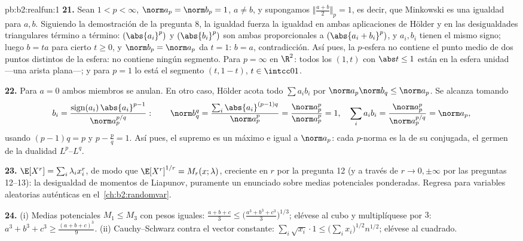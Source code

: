 \begin{solution}{pb:b2:realfun:1}
\textbf{21.} Sean $1 < p < \infty$, $\norm a_p = \norm b_p = 1$, $a
\neq b$, y supongamos $\bigl\Vert\frac{a+b}2\bigr\Vert_p = 1$, es
decir, que Minkowski es una igualdad para $a, b$. Siguiendo la
demostración de la pregunta 8, la igualdad fuerza la igualdad en
ambas aplicaciones de Hölder y en las desigualdades triangulares
término a término: $(\abs{a_i}^p)$ y $(\abs{b_i}^p)$ son ambas
proporcionales a $(\abs{a_i + b_i}^p)$, y $a_i, b_i$ tienen el
mismo signo; luego $b = ta$ para cierto $t \geq 0$, y $\norm b_p =
\norm a_p$ da $t = 1$: $b = a$, contradicción. Así pues, la
$p$-esfera no contiene el punto medio de dos puntos distintos de la
esfera: no contiene ningún segmento. Para $p = \infty$ en $\R^2$:
todos los $(1, t)$ con $\abs t \leq 1$ están en la esfera unidad
---una arista plana---; y para $p = 1$ lo está el segmento $(t, 1 -
t)$, $t \in \intcc01$.

\textbf{22.} Para $a = 0$ ambos miembros se anulan. En otro caso,
Hölder acota todo $\sum a_ib_i$ por $\norm a_p\norm b_q \leq \norm
a_p$. Se alcanza tomando
\[
b_i = \frac{\operatorname{sign}(a_i)\,\abs{a_i}^{p-1}}
{\norm a_p^{p/q}} :
\qquad
\norm b_q^q = \frac{\sum_i\abs{a_i}^{(p-1)q}}{\norm a_p^{p}}
= \frac{\norm a_p^p}{\norm a_p^p} = 1,
\quad
\sum_ia_ib_i = \frac{\norm a_p^p}{\norm a_p^{p/q}} =
\norm a_p ,
\]
usando $(p-1)q = p$ y $p - \frac pq = 1$. Así pues, el supremo es un
máximo e igual a $\norm a_p$: cada $p$-norma es la   de su
conjugada, el germen de la dualidad $L^p$--$L^q$.

\textbf{23.} $\E[X^r] = \sum_i\lambda_ix_i^r$, de modo que
$\E[X^r]^{1/r} = M_r(x; \lambda)$, creciente en $r$ por la pregunta
12 (y a través de $r \to 0, \pm\infty$ por las preguntas 12--13):
la desigualdad de momentos de Liapunov, puramente un enunciado
sobre medias potenciales ponderadas. Regresa para variables
aleatorias auténticas en el~\cref{ch:b2:randomvar}.

\textbf{24.} (i) Medias potenciales $M_1 \leq M_3$ con pesos
iguales: $\frac{a+b+c}3 \leq \bigl(\frac{a^3+b^3+c^3}3\bigr)^{1/3}$;
elévese al cubo y multiplíquese por $3$: $a^3 + b^3 + c^3 \geq
\frac{(a+b+c)^3}9$. (ii) Cauchy--Schwarz contra el vector
constante: $\sum_i\sqrt{x_i}\cdot1 \leq
\bigl(\sum_ix_i\bigr)^{1/2}n^{1/2}$; elévese al cuadrado.


\end{solution}
